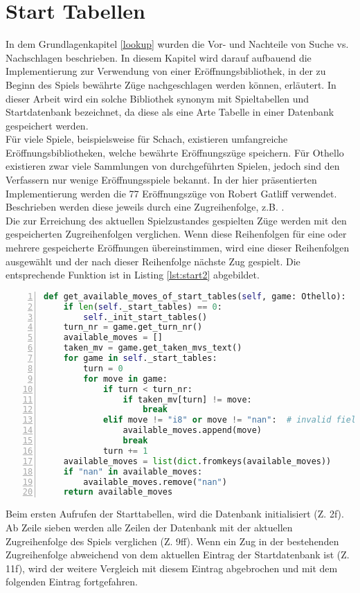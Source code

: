 \section{Start Tabellen}
In dem Grundlagenkapitel \ref{lookup} wurden die Vor- und Nachteile von Suche vs. Nachschlagen beschrieben. In diesem Kapitel wird darauf aufbauend die Implementierung zur Verwendung von einer Eröffnungsbibliothek, in der zu Beginn des Spiels bewährte Züge nachgeschlagen werden können, erläutert. In dieser Arbeit wird ein solche Bibliothek synonym mit Spieltabellen und Startdatenbank bezeichnet, da diese als eine Arte Tabelle in einer Datenbank gespeichert werden.
\\Für viele Spiele, beispielsweise für Schach, existieren umfangreiche Eröffnungsbibliotheken, welche bewährte Eröffnungszüge speichern. Für Othello existieren zwar viele Sammlungen von durchgeführten Spielen, jedoch sind den Verfassern nur wenige Eröffnungsspiele bekannt. In der hier präsentierten Implementierung werden die 77 Eröffnungszüge von Robert Gatliff \cite{open1} verwendet. Beschrieben werden diese jeweils durch eine Zugreihenfolge, z.B. . 
\\Die zur Erreichung des aktuellen Spielzustandes gespielten Züge werden mit den gespeicherten Zugreihenfolgen verglichen. Wenn diese Reihenfolgen für eine oder mehrere gespeicherte Eröffnungen übereinstimmen, wird eine dieser Reihenfolgen ausgewählt und der nach dieser Reihenfolge nächste Zug gespielt. Die entsprechende Funktion  ist in Listing \ref{lst:start2} abgebildet.
\newpage
\begin{lstlisting}[basicstyle=\footnotesize, caption = {Befüllen der Datenbank 2}, language = python, captionpos = t , numbers=left, label={lst:start2}]
def get_available_moves_of_start_tables(self, game: Othello):
	if len(self._start_tables) == 0:
		self._init_start_tables()
	turn_nr = game.get_turn_nr()
	available_moves = []
	taken_mv = game.get_taken_mvs_text()
	for game in self._start_tables:
		turn = 0
		for move in game:
			if turn < turn_nr:
				if taken_mv[turn] != move:
					break
			elif move != "i8" or move != "nan":  # invalid field
				available_moves.append(move)
				break
			turn += 1
	available_moves = list(dict.fromkeys(available_moves))
	if "nan" in available_moves:
		available_moves.remove("nan")
	return available_moves
\end{lstlisting}
Beim ersten Aufrufen der Starttabellen, wird die Datenbank initialisiert (Z. 2f). Ab Zeile sieben werden alle Zeilen der Datenbank mit der aktuellen Zugreihenfolge des Spiels verglichen (Z. 9ff). Wenn ein Zug in der bestehenden Zugreihenfolge abweichend von dem aktuellen Eintrag der Startdatenbank ist (Z. 11f), wird der weitere Vergleich mit diesem Eintrag abgebrochen und mit dem folgenden Eintrag fortgefahren.
